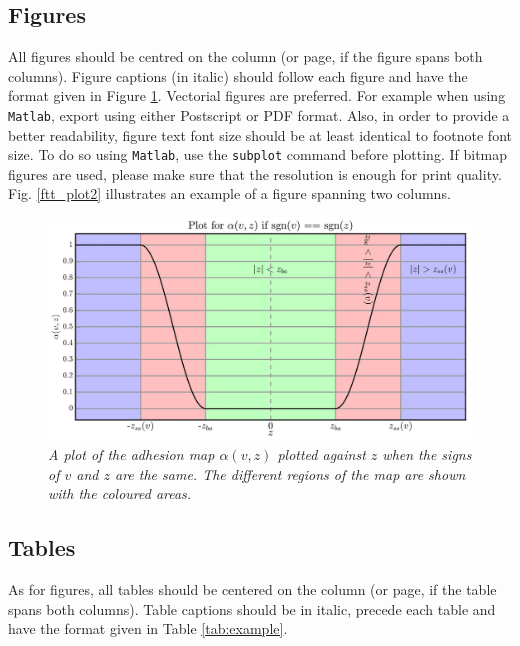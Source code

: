 \documentclass[twoside,a4paper]{article}
\begin{document}
\subsection{Figures}
\label{ssec:figures}
All figures should be centred on the column (or page, if the figure spans both columns).
Figure captions (in italic) should follow each figure and have the format given in Figure \ref{fft_plot}.
%
Vectorial figures are preferred. For example when using
\texttt{Matlab}, export using either Postscript or PDF format. Also,
in order to provide a better readability, figure text font size
should be at least identical to footnote font size. To do so using
\texttt{Matlab}, use the \texttt{subplot} command before plotting.
If bitmap figures are used, please make sure that the resolution is
enough for print quality. Fig. \ref{ftt_plot2} illustrates an
example of a figure spanning two columns.
%
\begin{figure}[ht]
\centerline{\includegraphics[width=1.0\columnwidth]{alphaPlot}}
\caption{\label{fft_plot}{\it A plot of the adhesion map $\alpha(v,z)$ plotted against $z$ when the signs of $v$ and $z$ are the same. The different regions of the map are shown with the coloured areas.}}
\end{figure}


\subsection{Tables}
As for figures, all tables should be centered on the column (or page, if the table spans both columns).
Table captions should be in italic, precede each table and have the format given in Table \ref{tab:example}.
\end{document}
